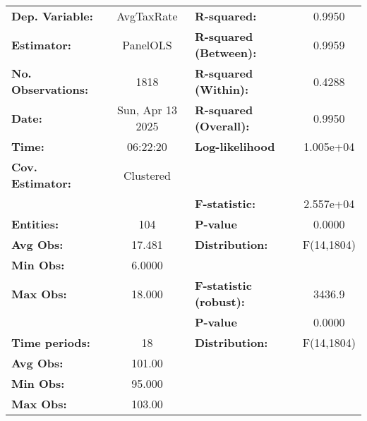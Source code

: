 \begin{center}
\begin{tabular}{lclc}
\toprule
\textbf{Dep. Variable:}                    &     AvgTaxRate     & \textbf{  R-squared:         }   &      0.9950      \\
\textbf{Estimator:}                        &      PanelOLS      & \textbf{  R-squared (Between):}  &      0.9959      \\
\textbf{No. Observations:}                 &        1818        & \textbf{  R-squared (Within):}   &      0.4288      \\
\textbf{Date:}                             &  Sun, Apr 13 2025  & \textbf{  R-squared (Overall):}  &      0.9950      \\
\textbf{Time:}                             &      06:22:20      & \textbf{  Log-likelihood     }   &    1.005e+04     \\
\textbf{Cov. Estimator:}                   &     Clustered      & \textbf{                     }   &                  \\
\textbf{}                                  &                    & \textbf{  F-statistic:       }   &    2.557e+04     \\
\textbf{Entities:}                         &        104         & \textbf{  P-value            }   &      0.0000      \\
\textbf{Avg Obs:}                          &       17.481       & \textbf{  Distribution:      }   &    F(14,1804)    \\
\textbf{Min Obs:}                          &       6.0000       & \textbf{                     }   &                  \\
\textbf{Max Obs:}                          &       18.000       & \textbf{  F-statistic (robust):} &      3436.9      \\
\textbf{}                                  &                    & \textbf{  P-value            }   &      0.0000      \\
\textbf{Time periods:}                     &         18         & \textbf{  Distribution:      }   &    F(14,1804)    \\
\textbf{Avg Obs:}                          &       101.00       & \textbf{                     }   &                  \\
\textbf{Min Obs:}                          &       95.000       & \textbf{                     }   &                  \\
\textbf{Max Obs:}                          &       103.00       & \textbf{                     }   &                  \\

\end{tabular}
\end{center}
